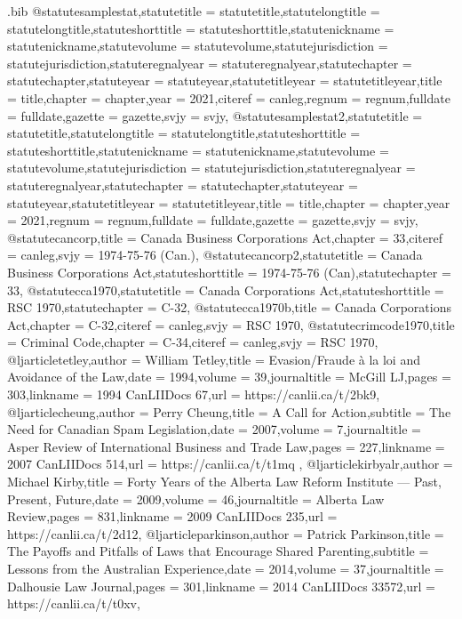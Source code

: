 \begin{filecontents*}[overwrite]{\jobname.bib}
@statute{samplestat,statutetitle = {statutetitle},statutelongtitle = {statutelongtitle},statuteshorttitle = {statuteshorttitle},statutenickname = {statutenickname},statutevolume = {statutevolume},statutejurisdiction = {statutejurisdiction},statuteregnalyear = {statuteregnalyear},statutechapter = {statutechapter},statuteyear = {statuteyear},statutetitleyear = {statutetitleyear},title = {title},chapter = {chapter},year = {2021},citeref = {canleg},regnum = {regnum},fulldate = {fulldate},gazette = {gazette},svjy = {svjy},}
@statute{samplestat2,statutetitle = {statutetitle},statutelongtitle = {statutelongtitle},statuteshorttitle = {statuteshorttitle},statutenickname = {statutenickname},statutevolume = {statutevolume},statutejurisdiction = {statutejurisdiction},statuteregnalyear = {statuteregnalyear},statutechapter = {statutechapter},statuteyear = {statuteyear},statutetitleyear = {statutetitleyear},title = {title},chapter = {chapter},year = {2021},regnum = {regnum},fulldate = {fulldate},gazette = {gazette},svjy = {svjy},}
@statute{cancorp,title = {Canada Business Corporations Act},chapter = {33},citeref = {canleg},svjy = {1974-75-76 (Can.\@)},}
@statute{cancorp2,statutetitle = {Canada Business Corporations Act},statuteshorttitle = {1974-75-76 (Can)},statutechapter = {33},}
@statute{cca1970,statutetitle = {Canada Corporations Act},statuteshorttitle = {RSC 1970},statutechapter = {C-32},}
@statute{cca1970b,title = {Canada Corporations Act},chapter = {C-32},citeref = {canleg},svjy = {RSC 1970},}
@statute{crimcode1970,title = {Criminal Code},chapter = {C-34},citeref = {canleg},svjy = {RSC 1970},}
@ljarticle{tetley,author = {William Tetley},title = {Evasion/Fraude à la loi and Avoidance of the Law},date = {1994},volume = {39},journaltitle = {McGill LJ},pages = {303},linkname = {1994 CanLIIDocs 67},url = {https://canlii.ca/t/2bk9},}
@ljarticle{cheung,author = {Perry Cheung},title = {A Call for Action},subtitle = {The Need for Canadian Spam Legislation},date = {2007},volume = {7},journaltitle = {Asper Review of International Business and Trade Law},pages = {227},linkname = {2007 CanLIIDocs 514},url = {https://canlii.ca/t/t1mq },}
@ljarticle{kirbyalr,author = {Michael Kirby},title = {Forty Years of the Alberta Law Reform Institute — Past, Present, Future},date = {2009},volume = {46},journaltitle = {Alberta Law Review},pages = {831},linkname = {2009 CanLIIDocs 235},url = {https://canlii.ca/t/2d12},}
@ljarticle{parkinson,author = {Patrick Parkinson},title = {The Payoffs and Pitfalls of Laws that Encourage Shared Parenting},subtitle = {Lessons from the Australian Experience},date = {2014},volume = {37},journaltitle = {Dalhousie Law Journal},pages = {301},linkname = {2014 CanLIIDocs 33572},url = {https://canlii.ca/t/t0xv},}

\end{filecontents*}
